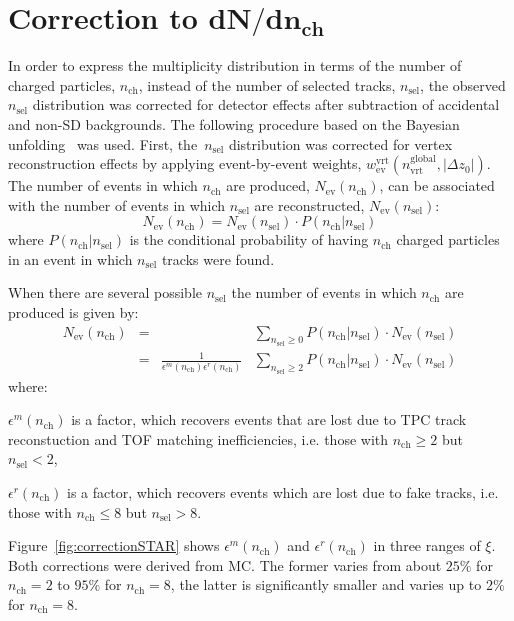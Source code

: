 \section[Correction to $dN/dn_{ch}$]{Correction to $\mathbf{dN/dn_\textrm{ch}}$}\label{section:star_dNdnch}
In order to express the multiplicity distribution in terms of the number of charged particles, $n_\textrm{ch}$, instead of the number of selected tracks, $n_\textrm{sel}$,  the observed $n_\textrm{sel}$ distribution was corrected for detector effects after subtraction of accidental and non-SD backgrounds. The  following procedure based on the Bayesian unfolding~\cite{unfolding:2016mok,unfolding:DAgostini} was used. First, the~$n_\textrm{sel}$ distribution was corrected for vertex reconstruction effects by applying event-by-event weights, $w_\textrm{ev}^\textrm{vrt}(n_\textrm{vrt}^\textrm{global},|\Delta z_0|)$. The number of events in which $n_\textrm{ch}$ are produced, $N_\textrm{ev}(n_\textrm{ch})$, can be associated with the number of events in which $n_\textrm{sel}$ are reconstructed, $N_\textrm{ev}(n_\textrm{sel})$:
\begin{equation}
N_\textrm{ev}\left(n_\textrm{ch}\right)=N_\textrm{ev}\left(n_\textrm{sel}\right)\cdot P\left(n_\textrm{ch}|n_\textrm{sel}\right)
\end{equation}
where $P(n_\textrm{ch}|n_\textrm{sel})$ is the conditional probability of having $n_\textrm{ch}$ charged particles in an event in which  $n_\textrm{sel}$ tracks were found.


\noindent When  there are several possible $n_\textrm{sel}$ the number of events in which $n_\textrm{ch}$ are produced is given by:
\begin{equation}
\begin{array}{ccccc}
N_\textrm{ev}(n_\textrm{ch})&=&&\sum_{n_\textrm{sel}\geq0}P(n_\textrm{ch}|n_\textrm{sel})\cdot N_\textrm{ev}(n_\textrm{sel})\\
&=&\frac{1}{\epsilon^{m}(n_\textrm{ch})\epsilon^{r}(n_\textrm{ch})}&\sum_{n_\textrm{sel}\geq2}P(n_\textrm{ch}|n_\textrm{sel})\cdot N_\textrm{ev}(n_\textrm{sel})
\end{array}
\end{equation}
where:
\begin{description}
	\item $\epsilon^{m}(n_\textrm{ch})$ is a factor, which recovers events that are lost due to TPC track reconstuction and  TOF matching inefficiencies, i.e. those with $n_\textrm{ch}\geq2$ but $n_\textrm{sel}<2$,
	\item $\epsilon^{r}(n_\textrm{ch})$ is a factor, which recovers  events which are lost due to fake tracks, i.e. those with $n_\textrm{ch}\leq 8$ but $n_\textrm{sel}> 8$.
\end{description}
Figure~\ref{fig:correctionSTAR} shows $\epsilon^{m}(n_\textrm{ch})$ and $\epsilon^{r}(n_\textrm{ch})$ in three ranges of $\xi$. Both corrections were derived from MC. The former varies from about $25\%$ for $n_\textrm{ch}=2$ to $95\%$ for $n_\textrm{ch}=8$, the latter is significantly smaller and varies up to $2\%$ for $n_\textrm{ch}=8$.


